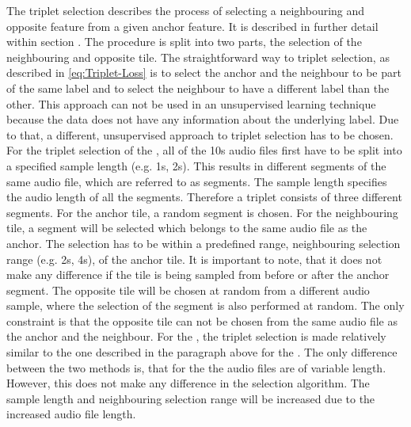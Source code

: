The triplet selection describes the process of selecting a neighbouring and opposite feature from a given anchor feature. It is described in further detail within section . The procedure is split into two parts, the selection of the neighbouring and opposite tile.
\newline
\newline
The straightforward way to triplet selection, as described in \ref{eq:Triplet-Loss} is to select the anchor and the neighbour to be part of the same label and to select the neighbour to have a different label than the other. This approach can not be used in an unsupervised learning technique because the data does not have any information about the underlying label. Due to that, a different, unsupervised approach to triplet selection has to be chosen.
\newline
\newline
For the triplet selection of the , all of the 10s audio files first have to be split into a specified sample length (e.g. 1s, 2s). This results in different segments of the same audio file, which are referred to as segments. The sample length specifies the audio length of all the segments. Therefore a triplet consists of three different segments.
\newline
For the anchor tile, a random segment is chosen. For the neighbouring tile, a segment will be selected which belongs to the same audio file as the anchor. The selection has to be within a predefined range, neighbouring selection range (e.g. 2s, 4s), of the anchor tile. It is important to note, that it does not make any difference if the tile is being sampled from before or after the anchor segment. The opposite tile will be chosen at random from a different audio sample, where the selection of the segment is also performed at random. The only constraint is that the opposite tile can not be chosen from the same audio file as the anchor and the neighbour.
\newline
\newline
For the , the triplet selection is made relatively similar to the one described in the paragraph above for the . The only difference between the two methods is, that for the  the audio files are of variable length. However, this does not make any difference in the selection algorithm. The sample length and neighbouring selection range will be increased due to the increased audio file length.

